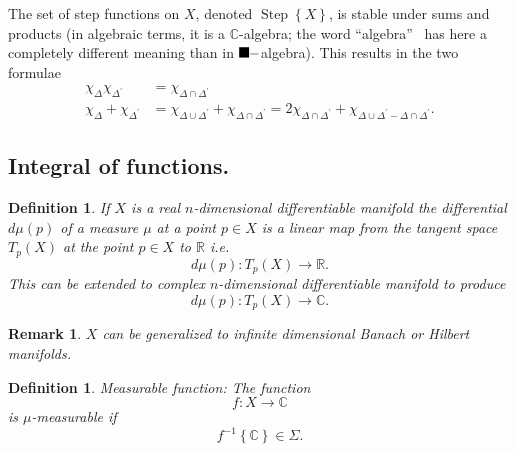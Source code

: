 \documentclass[aps,preprint]{revtex4}%
\providecommand{\U}[1]{\protect\rule{.1in}{.1in}}
\newtheorem{definition}[theorem]{Definition}
\newtheorem{remark}[theorem]{Remark}
\begin{document}
The set of step functions on $X$, denoted $\operatorname*{Step}\left\{
X\right\}  $, is stable under sums and products (in algebraic terms, it is a
$\mathbb{C}$-algebra; the word \textquotedblleft algebra\textquotedblright%
\ has here a completely different meaning than in $\U{3c3} -$algebra). This
results in the two formulae
\begin{align}
\chi_{\Delta}\chi_{\Delta^{\prime}}  &  =\chi_{\Delta\cap\Delta^{\prime}}\\
\chi_{\Delta}+\chi_{\Delta^{\prime}}  &  =\chi_{\Delta\cup\Delta^{\prime}%
}+\chi_{\Delta\cap\Delta^{\prime}}=2\chi_{\Delta\cap\Delta^{\prime}}%
+\chi_{\Delta\cup\Delta^{\prime}-\Delta\cap\Delta^{\prime}}.
\end{align}


\subsection{Integral of functions.}

\begin{definition}
If $X$ is a real $n$-dimensional differentiable manifold the differential
$d\mu\left(  p\right)  $ of a measure $\mu$ at a point $p\in X$ is a linear
map from the tangent space $T_{p}\left(  X\right)  $ at the point $p\in X$ to
$\mathbb{R}$ i.e.
\begin{equation}
d\mu\left(  p\right)  :T_{p}\left(  X\right)  \rightarrow\mathbb{R}.
\end{equation}
This can be extended to \emph{complex} $n$-dimensional differentiable manifold
to produce
\begin{equation}
d\mu\left(  p\right)  :T_{p}\left(  X\right)  \rightarrow\mathbb{C}.
\end{equation}

\end{definition}

\begin{remark}
$X$ can be generalized to \emph{infinite dimensional} Banach or Hilbert manifolds.
\end{remark}

\begin{definition}
Measurable function: The function
\begin{equation}
f:X\rightarrow\mathbb{C}%
\end{equation}
is $\mu$-measurable if
\begin{equation}
f^{-1}\left\{  \mathbb{C}\right\}  \in\Sigma.
\end{equation}

\end{definition}
\end{document}
